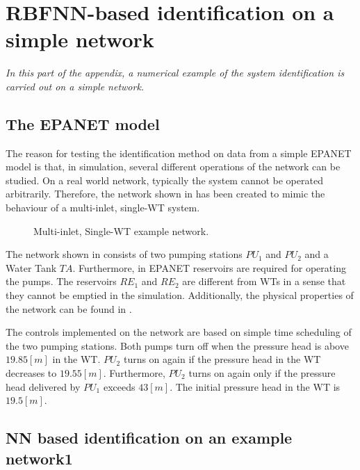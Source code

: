 \chapter{RBFNN-based identification on a simple network}
\label{NN_based_example}

\emph{In this part of the appendix, a numerical example of the system identification is carried out on a simple network.}

\section{The EPANET model}
\label{example1_EPANET}

The reason for testing the identification method on data from a simple EPANET model is that, in simulation, several different operations of the network can be studied. On a real world network, typically the system cannot be operated arbitrarily. Therefore, the network shown in  has been created to mimic the behaviour of a multi-inlet, single-WT system. 

\begin{figure}[H]
\centering
 
\caption{Multi-inlet, Single-WT example network.}
\label{fig:epanet_example1_id}
\end{figure}
\vspace{-3mm}

The network shown in  consists of two pumping stations $PU_1$ and $PU_2$ and a Water Tank $TA$. Furthermore, in EPANET reservoirs are required for operating the pumps. The reservoirs $RE_1$ and $RE_2$ are different from WTs in a sense that they cannot be emptied in the simulation. Additionally, the physical properties of the network can be found in . 

The controls implemented on the network are based on simple time scheduling of the two pumping stations. Both pumps turn off when the pressure head is above $19.85 [m]$ in the WT. $PU_2$ turns on again if the pressure head in the WT decreases to $19.55 [m]$. Furthermore, $PU_2$ turns on again only if the pressure head delivered by $PU_1$ exceeds $43 [m]$. The initial pressure head in the WT is $19.5 [m]$.

\section{NN based identification on an example network1}
\label{NN_based_example1} 

